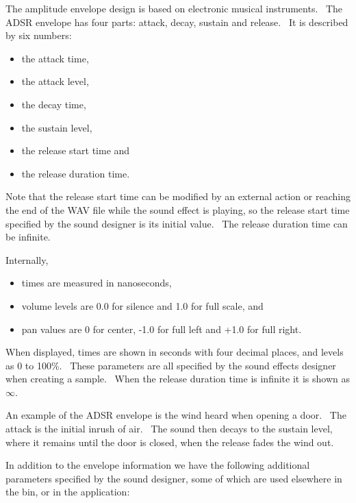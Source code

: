 \documentclass[letterpaper]{article}
\newcommand\liststyleLvi{%
\renewcommand\labelitemi{•}
\renewcommand\labelitemii{◦}
\renewcommand\labelitemiii{${\blacksquare}$}
\renewcommand\labelitemiv{•}
}
\newcommand\liststyleLvii{%
\renewcommand\labelitemi{•}
\renewcommand\labelitemii{◦}
\renewcommand\labelitemiii{${\blacksquare}$}
\renewcommand\labelitemiv{•}
}
\begin{document}
The amplitude envelope design is based on electronic musical
instruments. \ The ADSR envelope has four parts: attack, decay, sustain
and release. \ It is described by six numbers: 

\liststyleLvi
\begin{itemize}
\item the attack time, 
\item the attack level, 
\item the decay time, 
\item the sustain level, 
\item the release start time and 
\item the release duration time. \ 
\end{itemize}
Note that the release start time can be modified by an external action
or reaching the end of the WAV file while the sound effect is playing,
so the release start time specified by the sound designer is its
initial value. \ The release duration time can be infinite.

Internally, 

\liststyleLvii
\begin{itemize}
\item times are measured in nanoseconds, 
\item volume levels are 0.0 for silence and 1.0 for full scale, and 
\item pan values are 0 for center, -1.0 for full left and +1.0 for full
right. 
\end{itemize}
When displayed, times are shown in seconds with four decimal places, and
levels as 0 to 100\%. \ These parameters are all specified by the sound
effects designer when creating a sample. \ When the release duration
time is infinite it is shown as ${\infty}$.

An example of the ADSR envelope is the wind heard when opening a door.
\ The attack is the initial inrush of air. \ The sound then decays to
the sustain level, where it remains until the door is closed, when the
release fades the wind out.

In addition to the envelope information we have the following additional
parameters specified by the sound designer, some of which are used
elsewhere in the bin, or in the application:
\end{document}
